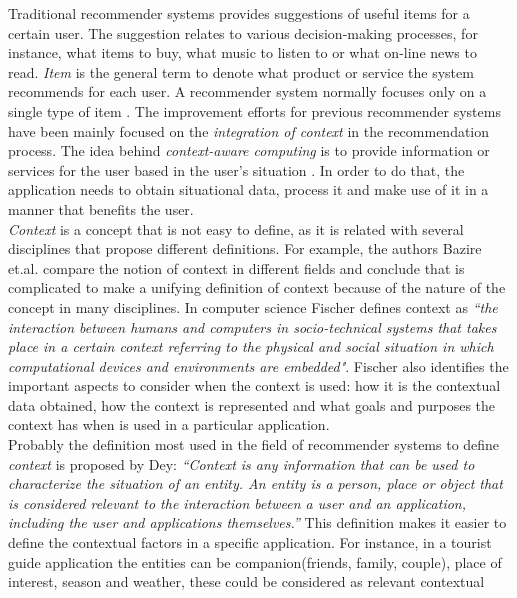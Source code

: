 Traditional recommender systems provides suggestions of useful items
for a certain user. The suggestion relates to various decision-making
processes, for instance, what items to buy, what music to listen to or
what on-line news to read. \textit{Item} is the general term to denote
what product or service the system recommends for each user. A
recommender system normally focuses only on a single type of item
\cite{resnick1997recommender}.
The improvement efforts for previous recommender systems have been mainly
focused on the
\textit{integration of context} in the recommendation process. 
The idea behind \textit{context-aware computing} is to provide
information or services for the user based in the user's situation
\cite{dey2001understanding}. In order to do that, the application 
needs to obtain situational data, process it and make use of it 
in a manner that benefits the user. \\ 
\textit{Context} is a concept that is not easy to define, as it is related with
several disciplines that propose different definitions. For example,
the authors Bazire et.al.\cite{bazire2005understanding} compare the
notion of context in different fields and conclude that is complicated to make a
unifying definition of context because of the nature of the concept in
many disciplines. In computer science Fischer\cite{fischer2012context}
defines context as \textit{``the interaction between humans and
computers in socio-technical systems that takes place in a certain
context referring to the physical and social situation in which
computational devices and environments are embedded"}. 
Fischer also identifies
the important aspects to consider when the context is used: how it is
the contextual data obtained, how the context is represented and what
goals and purposes the context has when is used in a particular
application. \\
Probably the definition most used in the field of recommender systems to 
define \textit{context} is proposed by Dey\cite{dey2001understanding}:
\textit{``Context is any information that can be used to characterize
the situation of an entity. An entity is a person, place or object
that is considered relevant to the interaction between a user and  an
application, including the user and applications themselves.''}  This
definition makes it easier to define the contextual factors in a
specific application. For instance, in a tourist guide application the
entities can be companion(friends, family, couple), place of interest,
season and weather, these could be considered as relevant contextual
